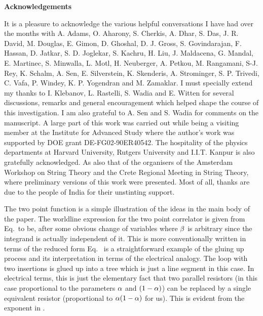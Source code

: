 \bigskip


\centerline{\bf Acknowledgements}
It is a pleasure to acknowledge the various helpful conversations I have had over the months 
with A. Adams, O. Aharony, S. Cherkis,
A. Dhar, S. Das, J. R. David, M. Douglas, 
E. Gimon, D. Ghoshal, D. J. Gross, S. Govindarajan, F. Hassan, D. Jatkar, 
S. D. Joglekar, S. Kachru, H. Liu, J. Maldacena,
G. Mandal, E. Martinec, 
S. Minwalla, L. Motl, H. Neuberger, A. Petkou, 
M. Rangamani, S-J. Rey, K. Schalm, A. Sen, E. Silverstein, K. Skenderis,
A. Strominger, S. P. Trivedi, C. Vafa, P. Windey, K. P. Yogendran and M. Zamaklar.  
I must specially extend my thanks to 
I. Klebanov, L. Rastelli, S. Wadia and E. Witten for several
discussions, remarks and general encouragement 
which helped shape the course of this investigation. I am also grateful to A. Sen and S. Wadia
for comments on the manuscript. 
A large part of this work was carried out 
while being a visiting member at the Institute for Advanced Study
where the author's work was supported by 
DOE grant DE-FG02-90ER40542.  
The hospitality of the physics departments 
at Harvard University, Rutgers University and I.I.T. Kanpur is also gratefully acknowledged. 
As also that of the organisers of the
Amsterdam Workshop on String Theory and the Crete Regional Meeting 
in String Theory, where preliminary versions of this work were presented.
Most of all, thanks are due to the people of India for their unstinting support. 


The two point function is a simple illustration of the ideas in the main body of the paper. 
The worldline expression for the two point correlator is given from Eq.\wlint\ to be, after 
some obvious change of variables 
\eqn{}
where ${\beta}$ is arbitrary since the integrand is actually independent of it. 
This is more conventionally written in terms of the reduced form 
\eqn{}
Eq. \twosim\ is a straightforward example of the gluing up process and its interpretation
in terms of the electrical analogy. The loop with two insertions is glued up into a tree which is
just a line segment in this case. In electrical terms, this is just the elementary fact that
two parallel resistors (in this case proportional to the parameters ${\alpha}$ and $(1-{\alpha})$) can be
replaced by a single equivalent resistor (proportional to ${\alpha}(1-{\alpha})$ for us). This is evident 
from the exponent in \twosim .


